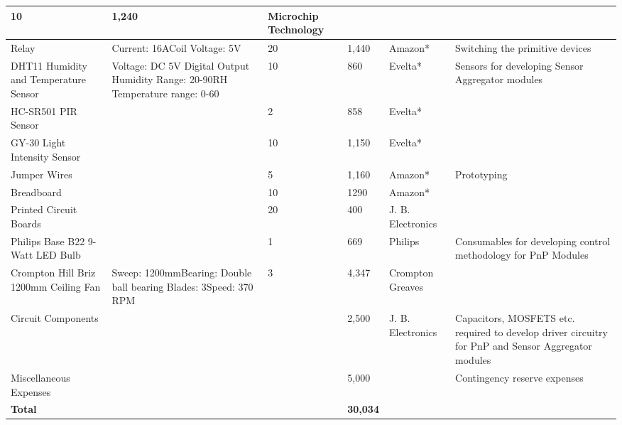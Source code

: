 \documentclass[12pt,a4paper,titlepage,twoside]{article}
\begin{document}
\begin{center}
\begin{longtable}{| m{3cm} | m{3cm}| m{1.7cm} | m{1.5cm} | m{2.7cm} | m{3cm} |}
                10&
                1,240&
                Microchip Technology&\\\hline
                Relay&
                Current: 16A\newline Coil Voltage: 5V&
                20&
                1,440&
                Amazon*&
                Switching the primitive devices\\ \hline
                DHT11 Humidity and Temperature Sensor&
                Voltage: DC 5V\newline
                Digital Output\newline
                Humidity Range: 20-90RH\newline
                Temperature range:	0-60
                &
                10&
                860&
                Evelta*&
                \multirow{3}{3cm}{Sensors for developing Sensor Aggregator modules}\\
                \cline{1-5}
                HC-SR501 PIR Sensor&&2&858&Evelta*&\\
                \cline{1-5}
                GY-30 Light Intensity Sensor&&10&1,150&Evelta*&\\
                \hline
                Jumper Wires&&5&1,160&Amazon*&\multirow{3}{*}{Prototyping}\\
                \cline{1-5}
                Breadboard&
                &
                10&
                1290&
                Amazon*&
                \\
                \cline{1-5}
                Printed Circuit Boards&
                &
                20&
                400&
                J. B. Electronics&\\
                \hline
                Philips Base B22 9-Watt LED Bulb&
                &
                1&
                669&
                Philips&
                \multirow{2}{3cm}{Consumables for developing control methodology for PnP Modules}\\
                \cline{1-5}
                Crompton Hill Briz 1200mm Ceiling Fan&
                Sweep: 1200mm\newline Bearing: Double ball bearing\newline
                Blades: 3\newline Speed: 370 RPM\newline&
                3&
                4,347&
                Crompton Greaves&\\
                \hline
                Circuit Components&&&2,500&J. B. Electronics&Capacitors, MOSFETS etc. required to develop driver circuitry for PnP and Sensor Aggregator modules\\
                \hline
                Miscellaneous Expenses&&&5,000&&Contingency reserve expenses\\
                \hline
                \multicolumn{3}{|l|}{\textbf{Total}}&\textbf{30,034}&&\\
                \hline
            \end{longtable}
        \end{center}
        
    
\end{document}
